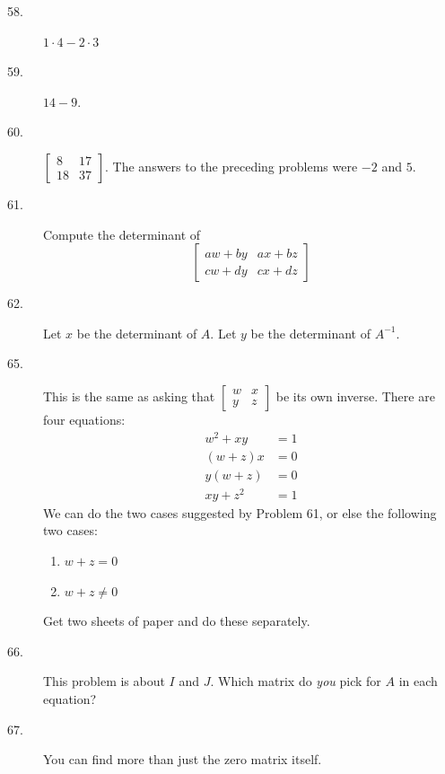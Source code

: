 \documentclass{article}
\begin{document}
\begin{description}

  \item[58.] $1 \cdot 4-2 \cdot 3$

  \item[59.] $14 - 9$.

  \item[60.] $\begin{bmatrix} 8 & 17 \\ 18 & 37 \end{bmatrix}$. The answers to the preceding problems were $-2$ and $5$.

  \item[61.] Compute the determinant of 
    \begin{equation*}
    \begin{bmatrix} aw+by & ax+bz \\ cw+dy & cx+dz \end{bmatrix}
    \end{equation*}

  \item[62.] Let $x$ be the determinant of $A$. Let $y$ be the determinant of $A^{-1}$.

  \item[65.] This is the same as asking that $\begin{bmatrix} w & x \\ y & z \end{bmatrix}$ be its own inverse. There are four equations:
    \begin{align*}
    w^2 + xy & = 1 \\
     (w+z) x & = 0 \\ 
     y (w+z) & = 0 \\
    xy + z^2 & = 1
    \end{align*}
    We can do the two cases suggested by Problem 61, or else the following two cases:
    \begin{enumerate}[\hspace{1cm}(I)]
      \item $w+z = 0$
      \item $w+z \neq 0$
    \end{enumerate}
    Get two sheets of paper and do these separately.

  \item[66.] This problem is about $I$ and $J$. Which matrix do \emph{you} pick for $A$ in each equation?

  \item[67.] You can find more than just the zero matrix itself. 


\end{description}
\end{document}
